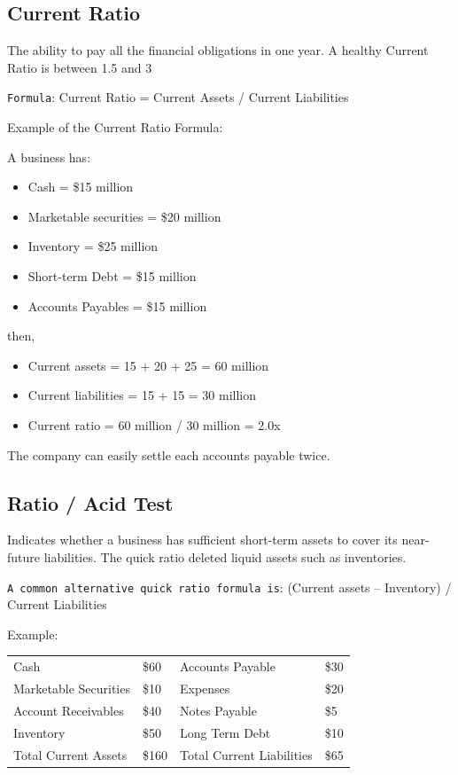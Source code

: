 \documentclass[]{book}
\providecommand{\tightlist}{%
  \setlength{\itemsep}{0pt}\setlength{\parskip}{0pt}}
\begin{document}
\subsection{Current Ratio}\label{current-ratio}

The ability to pay all the financial obligations in one year. A healthy
Current Ratio is between 1.5 and 3

\texttt{Formula}: Current Ratio = Current Assets / Current Liabilities

Example of the Current Ratio Formula:

A business has:

\begin{itemize}
\tightlist
\item
  Cash = \$15 million
\item
  Marketable securities = \$20 million
\item
  Inventory = \$25 million
\item
  Short-term Debt = \$15 million
\item
  Accounts Payables = \$15 million
\end{itemize}

then,

\begin{itemize}
\tightlist
\item
  Current assets = 15 + 20 + 25 = 60 million
\item
  Current liabilities = 15 + 15 = 30 million
\item
  Current ratio = 60 million / 30 million = 2.0x
\end{itemize}

The company can easily settle each accounts payable twice.

\subsection{Ratio / Acid Test}\label{ratio-acid-test}

Indicates whether a business has sufficient short-term assets to cover
its near-future liabilities. The quick ratio deleted liquid assets such
as inventories.

\texttt{A\ common\ alternative\ quick\ ratio\ formula\ is}: (Current
assets -- Inventory) / Current Liabilities

Example:

\begin{longtable}[]{@{}llll@{}}
\toprule
Cash & \$60 & Accounts Payable & \$30\tabularnewline
Marketable Securities & \$10 & Expenses & \$20\tabularnewline
Account Receivables & \$40 & Notes Payable & \$5\tabularnewline
Inventory & \$50 & Long Term Debt & \$10\tabularnewline
Total Current Assets & \$160 & Total Current Liabilities &
\$65\tabularnewline
\bottomrule
\end{longtable}
\end{document}

